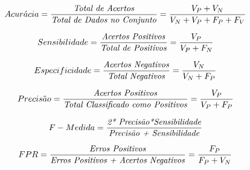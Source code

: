\begin{equation}
Acur\acute{a}cia =\frac{\textrm{\textit{Total de Acertos}}}{\textrm{\textit{Total de Dados no Conjunto}}} \\
=\frac{V_P + V_N}{V_N+V_P+F_P+F_V}
\label{eq:Acuracia}
\end{equation}

\begin{equation}
Sensibilidade =\frac{\textrm{\textit{Acertos Positivos}}}{\textrm{\textit{Total de Positivos}}} \\
=\frac{V_P}{V_P+F_N}
\label{eq:Sensibilidade}
\end{equation}

\begin{equation}
Especificidade =\frac{\textrm{\textit{Acertos Negativos}}}{\textrm{\textit{Total Negativos}}} \\
=\frac{V_N}{V_N+F_P}
\label{eq:Especificidade}
\end{equation}

\begin{equation}
Precis\tilde{a}o =\frac{\textrm{\textit{Acertos Positivos}}}{\textrm{\textit{Total Classificado como Positivos}}} \\
=\frac{V_P}{V_P+F_P}
\label{eq:Precisao}
\end{equation} 

\begin{equation}
F-Medida =\frac{\textrm{\textit{2* Precisão*Sensibilidade}}}{\textrm{\textit{Precisão + Sensibilidade}}} 
\label{eq:FMedida}
\end{equation} 

\begin{equation}
FPR =\frac{\textrm{\textit{Erros Positivos}}}{\textrm{\textit{Erros Positivos + Acertos Negativos}}}\\
=\frac{F_P}{F_P + V_N} 
\label{eq:FPR}
\end{equation}  
      
   





   
